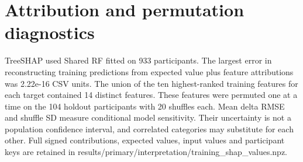 \documentclass[11pt,letterpaper]{article}
\begin{document}
\endgroup

\section{Attribution and permutation diagnostics}\label{attribution-and-permutation-diagnostics}

TreeSHAP used Shared RF fitted on 933 participants. The largest error in reconstructing training predictions from expected value plus feature attributions was 2.22e-16 CSV units. The union of the ten highest-ranked training features for each target contained 14 distinct features. These features were permuted one at a time on the 104 holdout participants with 20 shuffles each. Mean delta RMSE and shuffle SD measure conditional model sensitivity. Their uncertainty is not a population confidence interval, and correlated categories may substitute for each other. Full signed contributions, expected values, input values and participant keys are retained in results/primary/interpretation/training\_\allowbreak{}shap\_\allowbreak{}values.npz.

\begingroup\singlespacing\fontsize{10}{12}\selectfont\setlength{\parindent}{0pt}
\end{document}
